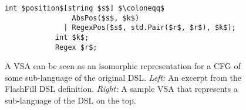 \begin{figure}[t]
    \uwsinglespace
    \begin{minipage}[b]{0.42\textwidth}
        \begin{lstlisting}[language=dsl, gobble=12]
            int $position$[string $s$] $\coloneqq$
                AbsPos($s$, $k$)
              | RegexPos($s$, std.Pair($r$, $r$), $k$);
            int $k$;
            Regex $r$;
        \end{lstlisting}
    \end{minipage}
    \hspace*{-5pt}
    \begin{minipage}[t]{0.577\textwidth}
        \small
        \begin{dot2tex}[options=--usepdflatex --figonly]
            
        \end{dot2tex}
    \end{minipage}
    \vspace*{-\baselineskip}
    \caption{
        A VSA can be seen as an isomorphic representation for a CFG of some sub-language of the original DSL.
        \emph{Left:} An excerpt from the FlashFill DSL definition.
        \emph{Right:} A sample VSA that represents a sub-language of the DSL on the top.}
    \label{fig:vsa:language-repr}
\end{figure}

